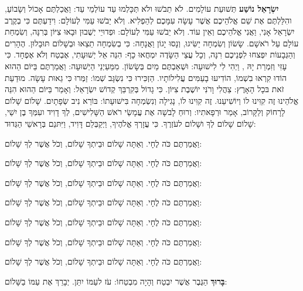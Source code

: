 \textbf{יִשְׂרָאֵל נוֹשַׁע } תְּשׁוּעַת עוֹלָמִים. לֹא תֵבֹשׁוּ ולֹא תְּכָּלְמוּ עַד עוֹלְמֵי עַד: וַאֲכַלְתֶּם אָכוֹל וְשָׂבוֹעַ, והִלַּלְתֶּם אֶת שֵׁם \Shem{} אֱלֹהֵיכֶם אֲשֶׁר עָשָׂה עִמָּכֶם לְהַפְלִיא. וְלֹא יֵבֹשׁוּ עַמִּי לְעוֹלָם: וִידַעְתֶּם כִּי בְקֶרֶב יִשְׂרָאֵל אָנִי, וַאֲנִי \Shem{} אֱלֹהֵיכֶם וְאֵין עוֹד. וְלֹא יֵבֹשׁוּ עַמִּי לְעוֹלָם: וּפְדוּיֵי \Shem{} יְשֻׁבוּן וּבָאוּ צִיּוֹן בְּרִנָּה, וְשִׂמְחַת עוֹלָם עַל רֹאשָׁם. שָׂשׂוֹן וְשִׂמְחָה יַשִּׂיגוּ, וְנָסוּ יָגוֹן וַאֲנָחָה: כִּי בְשִׂמְחָה תֵצֵאוּ וּבְשָׁלוֹם תּוּבָלוּן. הֶהָרִים וְהַגְּבָעוֹת יִפְצחוּ לִפְנֵיכֶם רִנָּה, וְכָל עֲצֵי הַשָּׂדֶה יִמְחֲאוּ כָף: הִנֵּה אֵל יְשׁוּעָתִי, אֶבְטַח וְלֹא אֶפְחָד. כִּי עָזִּי וְזִמְרַת יָהּ \Shem{}, וַיְהִי לִי לִישׁוּעָה: וּשְׁאַבְתֶּם מַיִם בְּשָׂשׂוֹן. מִמַּעַיְנֵי הַיְשׁוּעָה: וַאֲמַרְתֶּם בַּיּוֹם הַהוּא הוֹדוּ  קִרְאוּ בִשְׁמוֹ, הוֹדִיעוּ בָעַמִּים עֲלִילוֹתָיו. הַזְכִּירוּ כִּי נִשְׂגָּב שְׁמוֹ: זַמְּרוּ \Shem{} כִּי גֵאוּת עָשָׂה. מוּדַעַת זֹאת בּכָל הָאָרֶץ: צַהֲלִי וָרֹנִּי יוֹשֶׁבֶת צִיּוֹן. כִּי גָדוֹל בְּקִרְבֵּךְ קְדוֹשׁ יִשְׂרָאֵל: וְאָמַר בַּיּוֹם הַהוּא הִנֵּה אֱלֹהֵינוּ זֶה קִוִּינוּ לוֹ וְיוֹשִׁיעֵנוּ. זֶה \Shem{} קִוִּינוּ לוֹ, נָגִילָה וְנִשְׂמְחָה בִּישׁוּעָתוֹ: בּוֹרֵא נִיב שְׂפָתָיִם. שָׁלוֹם שָׁלוֹם לָרָחוֹק וְלַקָּרוֹב, אָמַר \Shem{} וּרְפָאתִיו: וְרוּחַ לָבשָׁה אֶת עֲמָשַׂי רֹאשׁ הַשָּׁלִישִׁים, לְךָ דָוִיד ועִמְּךָ בֶן יִשַׁי, שָׁלוֹם שָׁלוֹם לְךָ ושָׁלוֹם לעֹזְרֶךָ. כִּי עֲזָרְךָ אֱלֹהֶיךָ, וַיְקַבְּלֵם דָּוִיד, וַיִּתּנֵם בְּרָאשֵׁי הַגְּדוּד:

וַאֲמַרְתֶּם כֹּה לֶחָי. וְאַתָּה שָׁלוֹם וּבֵיתְךָ שָׁלוֹם, וְכֹל אֲשֶׁר לְךָ שָׁלוֹם:

וַאֲמַרְתֶּם כֹּה לֶחָי. וְאַתָּה שָׁלוֹם וּבֵיתְךָ שָׁלוֹם, וְכֹל אֲשֶׁר לְךָ שָׁלוֹם:

וַאֲמַרְתֶּם כֹּה לֶחָי. וְאַתָּה שָׁלוֹם וּבֵיתְךָ שָׁלוֹם, וְכֹל אֲשֶׁר לְךָ שָׁלוֹם:

וַאֲמַרְתֶּם כֹּה לֶחָי. וְאַתָּה שָׁלוֹם וּבֵיתְךָ שָׁלוֹם, וְכֹל אֲשֶׁר לְךָ שָׁלוֹם:

וַאֲמַרְתֶּם כֹּה לֶחָי. וְאַתָּה שָׁלוֹם וּבֵיתְךָ שָׁלוֹם, וְכֹל אֲשֶׁר לְךָ שָׁלוֹם:

וַאֲמַרְתֶּם כֹּה לֶחָי. וְאַתָּה שָׁלוֹם וּבֵיתְךָ שָׁלוֹם, וְכֹל אֲשֶׁר לְךָ שָׁלוֹם:

וַאֲמַרְתֶּם כֹּה לֶחָי. וְאַתָּה שָׁלוֹם וּבֵיתְךָ שָׁלוֹם, וְכֹל אֲשֶׁר לְךָ שָׁלוֹם:

\textbf{בָּרוּךְ} הַגֶּבֶר אֲשֶׁר יִבְטַח  וְהָיָה \Shem{} מִבְטַחוֹ: \Shem{} עֹז לעַמּוֹ יִתֵּן. \Shem{} יְבָרֵךְ אֶת עַמּוֹ בַשָּׁלוֹם:

